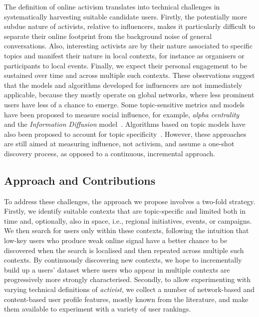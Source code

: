 The definition of online activism translates into technical challenges in systematically harvesting suitable candidate users.
%
Firstly, the potentially more subdue nature of activists, relative to influencers, makes it particularly difficult to separate their online footprint from the background noise of general conversations.
Also, interesting activists are by their nature associated to specific topics and manifest their nature in local contexts, for instance as organisers or participants to local events. 
Finally, we expect their personal engagement to be sustained over time and across multiple such contexts. 
These observations suggest that the models and algorithms developed for influencers are not immediately applicable, because they mostly operate on global networks, where less prominent users have less of a chance to emerge.
Some topic-sensitive metrics and models have been proposed to measure social influence, for example, \textit{alpha centrality}~\cite{Bonacich2001,Overbey2013} and the \textit{Information Diffusion} model~\cite{Pal2011}. Algorithms based on topic models have also been proposed to account for topic specificity~\cite{Zhao2011b}. However, these approaches are still aimed at measuring influence, not activism, and assume a one-shot discovery process, as opposed to a continuous, incremental approach.

\subsection{Approach and Contributions}

To address these challenges, the approach we propose involves a two-fold strategy. 
Firstly, we identify suitable contexts that are topic-specific and limited both in time and, optionally, also in space, i.e., regional initiatives, events, or campaigns.
We then search for users only within these contexts, following the intuition that low-key users who produce weak online signal have a better chance to be discovered when the search is localised and then repeated across multiple such contexts.
By continuously discovering new contexts, we hope to incrementally build up a users' dataset where users who appear in multiple contexts are progressively more strongly characterised.
%
Secondly, to allow experimenting with varying technical definitions of \textit{activist}, we collect a number of network-based and content-based user profile features, mostly known from the literature, and make them available to experiment with a variety of user rankings.

